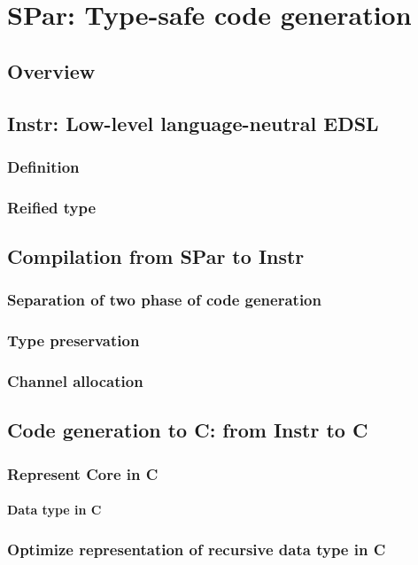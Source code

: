 \documentclass[a4paper, twoside]{report}
\begin{document}
\chapter{SPar: Type-safe code generation}
\section{Overview}
\section{Instr: Low-level language-neutral EDSL}
\subsection{Definition}
\subsection{Reified type}
\section{Compilation from SPar to Instr}
\subsection{Separation of two phase of code generation}
\subsection{Type preservation}
\subsection{Channel allocation}
\section{Code generation to C: from Instr to C}
\subsection{Represent Core in C}
\subsubsection{Data type in C}
\subsection{Optimize representation of recursive data type in C}
\end{document}
